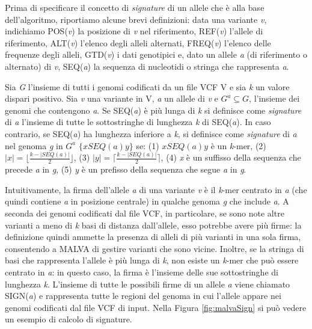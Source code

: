 \documentclass[../main.tex]{subfiles}
\begin{document}
Prima di specificare il concetto di \textit{signature} di un allele che è alla base dell'algoritmo, riportiamo alcune brevi definizioni: data una variante \textit{v}, indichiamo POS(\textit{v}) la posizione di \textit{v} nel riferimento, REF(\textit{v}) l'allele di riferimento, ALT(\textit{v}) l'elenco degli alleli alternati, FREQ(\textit{v}) l'elenco delle frequenze degli alleli, GTD(\textit{v}) i dati genotipici e, dato un allele \textit{a} (di riferimento o alternato) di \textit{v}, SEQ(\textit{a}) la sequenza di nucleotidi o stringa che rappresenta \textit{a}.

\theoremstyle{definition}
\begin{definition} 

Sia \textit{G} l'insieme di tutti i genomi codificati da un file VCF V e sia \textit{k} un valore dispari positivo. Sia \textit{v} una variante in V, \textit{a} un allele di \textit{v} e $\textit{G}^{a} \subseteq \textit{G}$, l'insieme dei genomi che contengono \textit{a}. Se SEQ(\textit{a}) è più lunga di \textit{k} si definisce come \textit{signature} di \textit{a} l'insieme di tutte le sottostringhe di lunghezza \textit{k} di SEQ(\textit{a}). In caso contrario, se SEQ(\textit{a}) ha lunghezza inferiore a \textit{k}, si definisce come \textit{signature} di \textit{a} nel genoma \textit{g} in $\textit{G}^{a}$ $\{ \textit{x}SEQ(\textit{a})\textit{y} \} $ se: (1) $\textit{x}SEQ(\textit{a})\textit{y}$ è un \textit{k}-mer, (2) $|\textit{x}| = \lfloor \frac{k-|SEQ(\textit{a})|}{2} \rfloor$, (3) $|\textit{y}| = \lceil \frac{k-|SEQ(\textit{a})|}{2} \rceil$, (4) \textit{x} è un suffisso della sequenza che precede \textit{a} in \textit{g}, (5) \textit{y} è un prefisso della sequenza che segue \textit{a} in \textit{g}.

\end{definition}

\noindent
Intuitivamente, la firma dell'allele \textit{a} di una variante \textit{v} è il \textit{k}-mer centrato in \textit{a} (che quindi contiene \textit{a} in posizione centrale) in qualche genoma \textit{g} che include \textit{a}. A seconda dei genomi codificati dal file VCF, in particolare, se sono note altre varianti a meno di \textit{k} basi di distanza dall'allele, esso potrebbe avere più firme: la definizione quindi ammette la presenza di alleli di più varianti in una sola firma, consentendo a MALVA di gestire varianti che sono vicine. Inoltre, se la stringa di basi che rappresenta l'allele è più lunga di \textit{k}, non esiste un \textit{k}-mer che può essere centrato in \textit{a}: in questo caso, la firma è l'insieme delle sue sottostringhe di lunghezza \textit{k}. L'insieme di tutte le possibili firme di un allele \textit{a} viene chiamato SIGN(\textit{a}) e rappresenta tutte le regioni del genoma in cui l'allele appare nei genomi codificati dal file VCF di input. Nella Figura \ref{fig:malvaSign} si può vedere un esempio di calcolo di signature.
\end{document}

